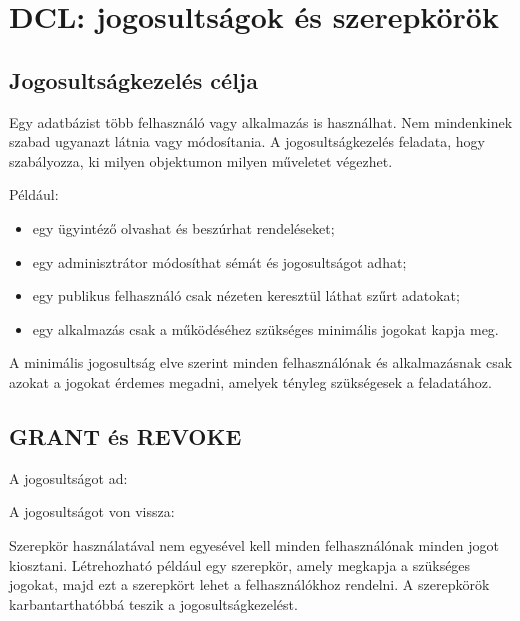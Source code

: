 
\section{DCL: jogosultságok és szerepkörök}

\subsection{Jogosultságkezelés célja}

Egy adatbázist több felhasználó vagy alkalmazás is használhat. Nem mindenkinek szabad ugyanazt látnia vagy módosítania. A jogosultságkezelés feladata, hogy szabályozza, ki milyen objektumon milyen műveletet végezhet.

Például:

\begin{itemize}
  \item egy ügyintéző olvashat és beszúrhat rendeléseket;
  \item egy adminisztrátor módosíthat sémát és jogosultságot adhat;
  \item egy publikus felhasználó csak nézeten keresztül láthat szűrt adatokat;
  \item egy alkalmazás csak a működéséhez szükséges minimális jogokat kapja meg.
\end{itemize}

A minimális jogosultság elve szerint minden felhasználónak és alkalmazásnak csak azokat a jogokat érdemes megadni, amelyek tényleg szükségesek a feladatához.

\subsection{GRANT és REVOKE}

A  jogosultságot ad:

\begin{center}
\end{center}

A  jogosultságot von vissza:

\begin{center}
\end{center}

Szerepkör használatával nem egyesével kell minden felhasználónak minden jogot kiosztani. Létrehozható például egy  szerepkör, amely megkapja a szükséges  jogokat, majd ezt a szerepkört lehet a felhasználókhoz rendelni. A szerepkörök karbantarthatóbbá teszik a jogosultságkezelést.

